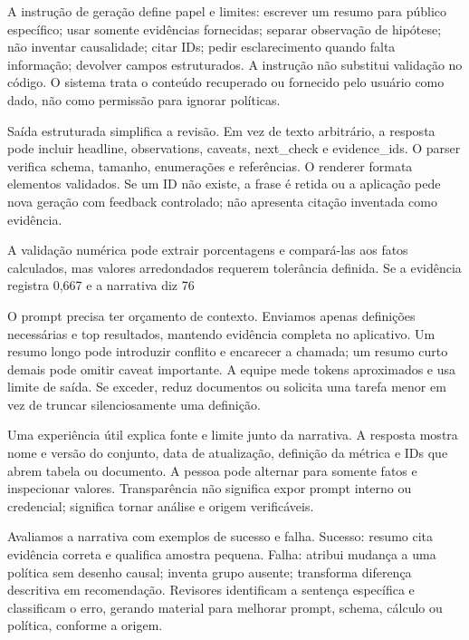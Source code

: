 A instrução de geração define papel e limites: escrever um resumo para público específico; usar somente evidências fornecidas; separar observação de hipótese; não inventar causalidade; citar IDs; pedir esclarecimento quando falta informação; devolver campos estruturados. A instrução não substitui validação no código. O sistema trata o conteúdo recuperado ou fornecido pelo usuário como dado, não como permissão para ignorar políticas.

Saída estruturada simplifica a revisão. Em vez de texto arbitrário, a resposta pode incluir headline, observations, caveats, next\_check e evidence\_ids. O parser verifica schema, tamanho, enumerações e referências. O renderer formata elementos validados. Se um ID não existe, a frase é retida ou a aplicação pede nova geração com feedback controlado; não apresenta citação inventada como evidência.

A validação numérica pode extrair porcentagens e compará-las aos fatos calculados, mas valores arredondados requerem tolerância definida. Se a evidência registra 0,667 e a narrativa diz 76%

O prompt precisa ter orçamento de contexto. Enviamos apenas definições necessárias e top resultados, mantendo evidência completa no aplicativo. Um resumo longo pode introduzir conflito e encarecer a chamada; um resumo curto demais pode omitir caveat importante. A equipe mede tokens aproximados e usa limite de saída. Se exceder, reduz documentos ou solicita uma tarefa menor em vez de truncar silenciosamente uma definição.

Uma experiência útil explica fonte e limite junto da narrativa. A resposta mostra nome e versão do conjunto, data de atualização, definição da métrica e IDs que abrem tabela ou documento. A pessoa pode alternar para somente fatos e inspecionar valores. Transparência não significa expor prompt interno ou credencial; significa tornar análise e origem verificáveis.

Avaliamos a narrativa com exemplos de sucesso e falha. Sucesso: resumo cita evidência correta e qualifica amostra pequena. Falha: atribui mudança a uma política sem desenho causal; inventa grupo ausente; transforma diferença descritiva em recomendação. Revisores identificam a sentença específica e classificam o erro, gerando material para melhorar prompt, schema, cálculo ou política, conforme a origem.

